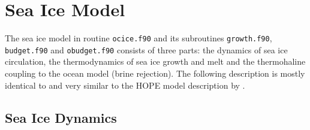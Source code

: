 %
%



\thispagestyle{empty}
 
\chapter[Sea Ice Model]
{\Large{\bf Sea Ice Model}}
\label{ch:ice}

The sea ice model in routine \texttt{ocice.f90} and its subroutines \texttt{growth.f90}, 
\texttt{budget.f90} and \texttt{obudget.f90} consists of three parts:
the dynamics of sea ice circulation, the thermodynamics of sea ice growth and melt and 
the thermohaline coupling to the ocean model (brine rejection).
The following description is mostly identical to \citet{Marsland:2003}
and very similar to the {HOPE} model description by \citet{wolff97}.


\section{Sea Ice Dynamics}
\label{ch:ice:dynamics}

